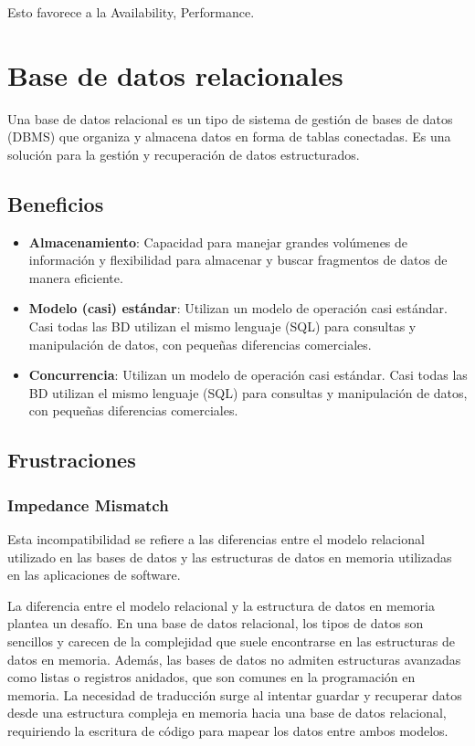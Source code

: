\documentclass{article}
\begin{document}
		Esto favorece a la Availability, Performance.
		
		
		\section{Base de datos relacionales}
		Una base de datos relacional es un tipo de sistema de gestión de bases de datos (DBMS) que organiza y almacena datos en forma de tablas conectadas. Es una solución para la gestión y recuperación de datos estructurados.
		
		
		\subsection{Beneficios}
		\begin{itemize}
			\item {\textbf{Almacenamiento}}: Capacidad para manejar grandes volúmenes de información y flexibilidad para almacenar y buscar fragmentos de datos de manera eficiente.
			
			\item {\textbf{Modelo (casi) estándar}}: Utilizan un modelo de operación casi estándar.
			Casi todas las BD utilizan el mismo lenguaje (SQL) para consultas y manipulación de datos, con pequeñas diferencias comerciales.
			
			\item {\textbf{Concurrencia}}: Utilizan un modelo de operación casi estándar.
			Casi todas las BD utilizan el mismo lenguaje (SQL) para consultas y manipulación de datos, con pequeñas diferencias comerciales.
		\end{itemize}
		
	
		
		\subsection{Frustraciones}
		
		\subsubsection{Impedance Mismatch}
		Esta incompatibilidad se refiere a las diferencias entre el modelo relacional utilizado en las bases de datos y las estructuras de datos en memoria utilizadas en las aplicaciones de software.
		
		La diferencia entre el modelo relacional y la estructura de datos en memoria plantea un desafío. En una base de datos relacional, los tipos de datos son sencillos y carecen de la complejidad que suele encontrarse en las estructuras de datos en memoria. Además, las bases de datos no admiten estructuras avanzadas como listas o registros anidados, que son comunes en la programación en memoria. La necesidad de traducción surge al intentar guardar y recuperar datos desde una estructura compleja en memoria hacia una base de datos relacional, requiriendo la escritura de código para mapear los datos entre ambos modelos.
		
\end{document}
